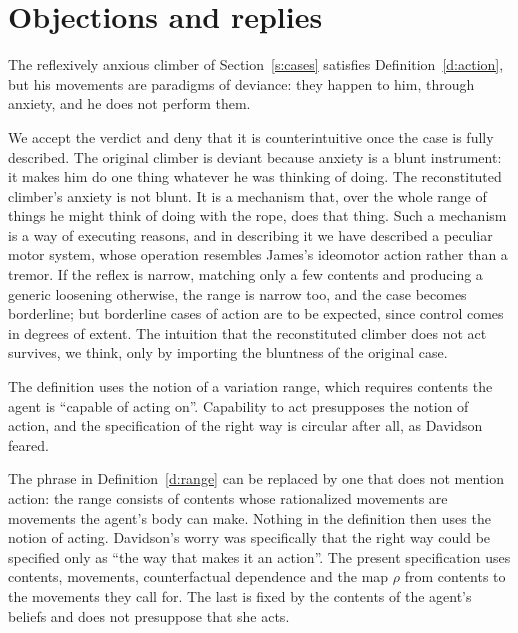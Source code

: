 \documentclass{situationist-preprint}
\begin{document}
\section{Objections and replies}\label{s:objections}

\begin{objection}\label{o:wayward}
The reflexively anxious climber of Section~\ref{s:cases} satisfies Definition~\ref{d:action}, but his movements are paradigms of deviance: they happen to him, through anxiety, and he does not perform them.
\end{objection}

\begin{reply}
We accept the verdict and deny that it is counterintuitive once the case is fully described. The original climber is deviant because anxiety is a blunt instrument: it makes him do one thing whatever he was thinking of doing. The reconstituted climber's anxiety is not blunt. It is a mechanism that, over the whole range of things he might think of doing with the rope, does that thing. Such a mechanism is a way of executing reasons, and in describing it we have described a peculiar motor system, whose operation resembles James's ideomotor action rather than a tremor. If the reflex is narrow, matching only a few contents and producing a generic loosening otherwise, the range is narrow too, and the case becomes borderline; but borderline cases of action are to be expected, since control comes in degrees of extent. The intuition that the reconstituted climber does not act survives, we think, only by importing the bluntness of the original case.
\end{reply}

\begin{objection}[Circularity]\label{o:circ}
The definition uses the notion of a variation range, which requires contents the agent is \enquote{capable of acting on}. Capability to act presupposes the notion of action, and the specification of the right way is circular after all, as Davidson feared.
\end{objection}

\begin{reply}
The phrase in Definition~\ref{d:range} can be replaced by one that does not mention action: the range consists of contents whose rationalized movements are movements the agent's body can make. Nothing in the definition then uses the notion of acting. Davidson's worry was specifically that the right way could be specified only as \enquote{the way that makes it an action}. The present specification uses contents, movements, counterfactual dependence and the map $\rho$ from contents to the movements they call for. The last is fixed by the contents of the agent's beliefs and does not presuppose that she acts.
\end{reply}
\end{document}
